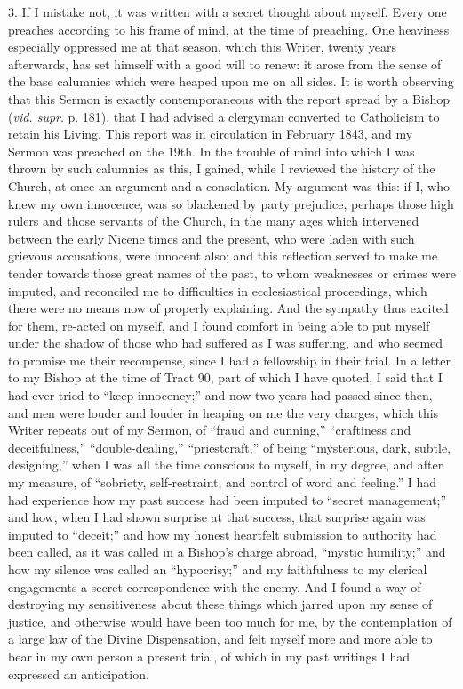 3. If I mistake not, it was written with a secret thought about
myself. Every one preaches according to his frame of mind, at the time
of preaching. One heaviness especially oppressed me at that season,
which this Writer, twenty years afterwards, has set himself with a good
will to renew: it arose from the sense of the base calumnies which were
heaped upon me on all
sides. It is worth observing that this Sermon is exactly
contemporaneous with the report spread by a Bishop (\emph{vid. supr}. p.
181), that I had advised a clergyman converted to Catholicism to retain
his Living. This report was in circulation in February 1843, and my
Sermon was preached on the 19th. In the trouble of mind into which I was thrown by such calumnies as
this, I gained, while I reviewed the history of the Church, at once
an argument and a consolation. My argument was this: if I, who knew my
own innocence, was so blackened by party prejudice, perhaps those high
rulers and those servants of the Church, in the many ages which
intervened between the early Nicene times and the present, who were
laden with such grievous accusations, were innocent also; and this
reflection served to make me tender towards those great names of the
past, to whom weaknesses or crimes were imputed, and reconciled me to
difficulties in ecclesiastical proceedings, which there were no means
now of properly explaining. And the sympathy thus excited for them,
re-acted on myself, and I found comfort in being able to put myself under
the shadow of those who had suffered as I was suffering, and who seemed
to promise me their recompense, since I had a fellowship in their trial.
In a letter to my Bishop at the time of Tract 90, part of which I have
quoted, I said that I had ever tried to ``keep innocency;'' and
now two years had passed since then, and men were louder and louder in heaping on me the very charges, which this
Writer repeats out of
my Sermon, of ``fraud and cunning,'' ``craftiness and deceitfulness,'' ``double-dealing,'' ``priestcraft,'' of being
``mysterious, dark, subtle, designing,'' when I was all the time
conscious to myself, in my degree, and after my measure, of
``sobriety, self-restraint, and control of word and feeling.'' I
had had experience how my past success had been imputed to ``secret
management;'' and how, when I had shown surprise at that success,
that surprise again was imputed to ``deceit;'' and how my honest
heartfelt submission to authority had been called, as it was called in a Bishop's
charge abroad, ``mystic humility;'' and how my silence was called an
``hypocrisy;'' and my faithfulness to my clerical engagements a
secret correspondence with the enemy. And I found a way of destroying my
sensitiveness about these things which jarred upon my sense of justice,
and otherwise would have been too much for me, by the contemplation of a
large law of the Divine Dispensation, and felt myself more and more able to bear in my own person a present
trial, of which in my past writings I had expressed an anticipation.

